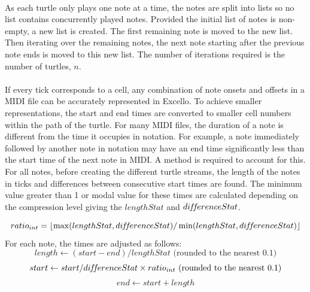 \paragraph{} As each turtle only plays one note at a time, the notes are split into lists so no list contains concurrently played notes. Provided the initial list of notes is non-empty, a new list is created. The first remaining note is moved to the new list. Then iterating over the remaining notes, the next note starting after the previous note ends is moved to this new list. The number of iterations required is the number of turtles, $n$.

\paragraph{} If every tick corresponds to a cell, any combination of note onsets and offsets in a MIDI file can be accurately represented in Excello. To achieve smaller representations, the start and end times are converted to smaller cell numbers within the path of the turtle. For many MIDI files, the duration of a note is different from the time it occupies in notation. For example, a note immediately followed by another note in notation may have an end time significantly less than the start time of the next note in MIDI. A method is required to account for this. For all notes, before creating the different turtle streams, the length of the notes in ticks and differences between consecutive start times are found. The minimum value greater than 1 or modal value for these times are calculated depending on the compression level giving the $lengthStat$ and $di\hspace{-0.1em}f\hspace{-0.2em}f\hspace{-0.1em}erenceStat$.
\vspace{-10pt}

  $$ratio_{int} = \lfloor\max(lengthStat, di\hspace{-0.1em}f\hspace{-0.2em}f\hspace{-0.1em}erenceStat)/\min(lengthStat, di\hspace{-0.1em}f\hspace{-0.2em}f\hspace{-0.1em}erenceStat)\rfloor$$
For each note, the times are adjusted as follows:
  $$length \gets (start - end) / lengthStat \text{ (rounded to the nearest 0.1)}$$
  $$start \gets start / di\hspace{-0.1em}f\hspace{-0.2em}f\hspace{-0.1em}erenceStat \times ratio_{int} \text{ (rounded to the nearest 0.1)}$$
  $$end \gets start +length$$

